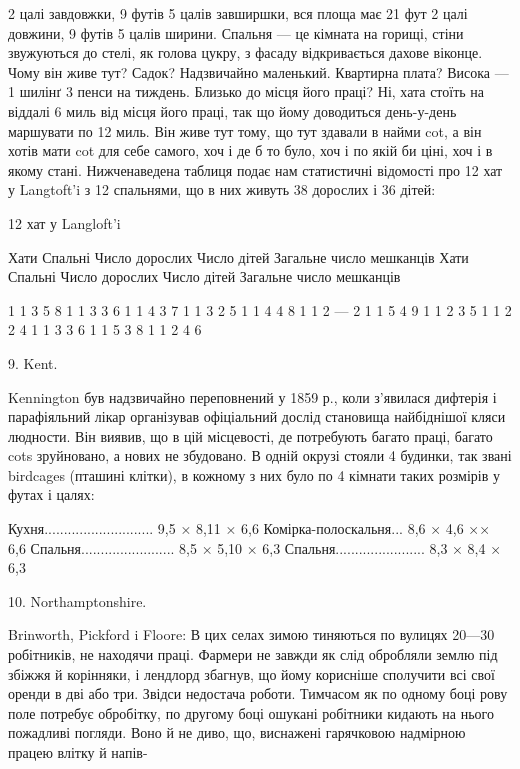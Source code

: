 2 цалі завдовжки, 9 футів 5 цалів завширшки, вся площа має
21 фут 2 цалі довжини, 9 футів 5 цалів ширини. Спальня — це
кімната на горищі, стіни звужуються до стелі, як голова цукру,
з фасаду відкривається дахове віконце. Чому він живе тут?
Садок? Надзвичайно маленький. Квартирна плата? Висока —
1 шилінґ 3 пенси на тиждень. Близько до місця його праці?
Ні, хата стоїть на віддалі 6 миль від місця його праці, так що
йому доводиться день-у-день маршувати по 12 миль. Він живе
тут тому, що тут здавали в найми cot, а він хотів мати cot для
себе самого, хоч і де б то було, хоч і по якій би ціні, хоч і в якому
стані. Нижченаведена таблиця подає нам статистичні відомості
про 12 хат у Langtoft’i з 12 спальнями, що в них живуть 38 дорослих
і 36 дітей:

12 хат у Langloft’i

Хати   Спальні  Число дорослих    Число дітей    Загальне число мешканців    Хати    Спальні   
Число дорослих    Число дітей    Загальне число мешканців

1    1    3    5    8    1    1    3    3    6
1    1    4    3    7    1    1    3    2    5
1    1    4    4    8    1    1    2    —   2
1    1    5    4    9    1    1    2    3    5
1    1    2    2    4    1    1    3    3    6
1    1    5    3    8    1    1    2    4    6

9. Kent.

Kennington був надзвичайно переповнений у 1859 р., коли
з’явилася дифтерія і парафіяльний лікар організував офіціальний
дослід становища найбіднішої кляси людности. Він виявив, що
в цій місцевості, де потребують багато праці, багато cots зруйновано,
а нових не збудовано. В одній окрузі стояли 4 будинки,
так звані birdcages (пташині клітки), в кожному з них було по
4 кімнати таких розмірів у футах і цалях:

Кухня............................     9,5 × 8,11 × 6,6
Комірка-полоскальня...      8,6 × 4,6 ×× 6,6
Спальня........................     8,5 × 5,10 × 6,3
Спальня.......................      8,3 × 8,4 × 6,3

10. Northamptonshire.

Brinworth, Pickford i Floore: В цих селах зимою тиняються
по вулицях 20—30 робітників, не находячи праці. Фармери не
завжди як слід обробляли землю під збіжжя й корінняки, і лендлорд
збагнув, що йому корисніше сполучити всі свої оренди
в дві або три. Звідси недостача роботи. Тимчасом як по одному
боці рову поле потребує обробітку, по другому боці ошукані
робітники кидають на нього пожадливі погляди. Воно й не диво,
що, виснажені гарячковою надмірною працею влітку й напів-

